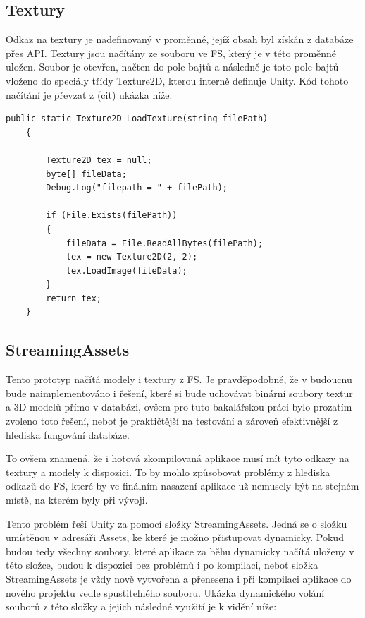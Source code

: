 \documentclass[thesis=B,czech]{FITthesis}[2012/06/26]
\begin{document}
    \subsection{Textury}
    
    Odkaz na textury je nadefinovaný v proměnné, jejíž obsah byl získán z databáze přes API. Textury jsou načítány ze souboru ve FS, který je v této proměnné uložen. Soubor je otevřen, načten do pole bajtů a následně je toto pole bajtů vloženo do speciály třídy Texture2D, kterou interně definuje Unity. Kód tohoto načítání je převzat z (cit) ukázka níže.

\begin{lstlisting}[frame=single]
  public static Texture2D LoadTexture(string filePath)
    {

        Texture2D tex = null;
        byte[] fileData;
        Debug.Log("filepath = " + filePath);

        if (File.Exists(filePath))
        {
            fileData = File.ReadAllBytes(filePath);
            tex = new Texture2D(2, 2);
            tex.LoadImage(fileData);
        }
        return tex;
    }
        \end{lstlisting}	
        
        
    \subsection{StreamingAssets}
Tento prototyp načítá modely i textury z FS. Je pravděpodobné, že v budoucnu bude naimplementováno i řešení, které si bude uchovávat binární soubory textur a 3D modelů přímo v databázi, ovšem pro tuto bakalářskou práci bylo prozatím zvoleno toto řešení, neboť je praktičtější na testování a zároveň efektivnější z hlediska fungování databáze.

To ovšem znamená, že i hotová zkompilovaná aplikace musí mít tyto odkazy na textury a modely k dispozici. To by mohlo způsobovat problémy z hlediska odkazů do FS, které by ve finálním nasazení aplikace už nemusely být na stejném místě, na kterém byly při vývoji.

Tento problém řeší Unity za pomocí složky StreamingAssets. Jedná se o složku umístěnou v adresáři Assets, ke které je možno přistupovat dynamicky. Pokud budou tedy všechny soubory, které aplikace za běhu dynamicky načítá uloženy v této složce, budou k dispozici bez problémů i po kompilaci, neboť složka StreamingAssets je vždy nově vytvořena a přenesena i při kompilaci aplikace do nového projektu vedle spustitelného souboru. Ukázka dynamického volání souborů z této složky a jejich následné využití je k vidění níže:
\end{document}
